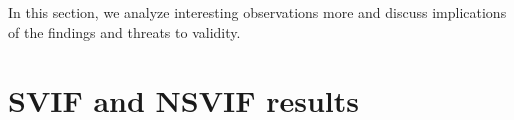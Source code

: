 


In this section, we analyze interesting observations more and discuss implications of the findings and threats to validity.
\section{ SVIF and NSVIF results}
\label{secSVIF}

